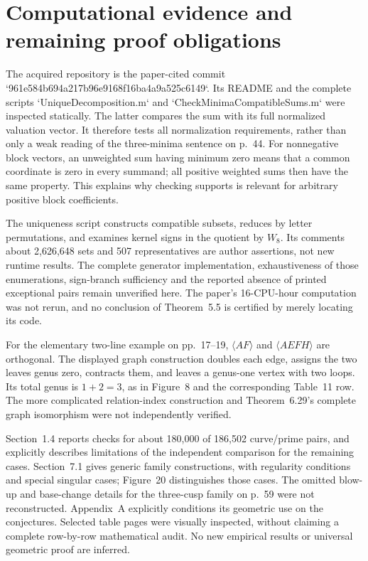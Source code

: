\documentclass[10pt]{article}
\begin{document}
\section*{Computational evidence and remaining proof obligations}
The acquired repository is the paper-cited commit `961e584b694a217b96e9168f16ba4a9a525c6149`. Its README and the complete scripts `UniqueDecomposition.m` and `CheckMinimaCompatibleSums.m` were inspected statically. The latter compares the sum with its full normalized valuation vector. It therefore tests all normalization requirements, rather than only a weak reading of the three-minima sentence on p. 44. For nonnegative block vectors, an unweighted sum having minimum zero means that a common coordinate is zero in every summand; all positive weighted sums then have the same property. This explains why checking supports is relevant for arbitrary positive block coefficients.\par
The uniqueness script constructs compatible subsets, reduces by letter permutations, and examines kernel signs in the quotient by \(W_8\). Its comments about 2,626,648 sets and 507 representatives are author assertions, not new runtime results. The complete generator implementation, exhaustiveness of those enumerations, sign-branch sufficiency and the reported absence of printed exceptional pairs remain unverified here. The paper’s 16-CPU-hour computation was not rerun, and no conclusion of Theorem 5.5 is certified by merely locating its code.\par
For the elementary two-line example on pp. 17–19, \(\langle AF\rangle\) and \(\langle AEFH\rangle\) are orthogonal. The displayed graph construction doubles each edge, assigns the two leaves genus zero, contracts them, and leaves a genus-one vertex with two loops. Its total genus is \(1+2=3\), as in Figure 8 and the corresponding Table 11 row. The more complicated relation-index construction and Theorem 6.29’s complete graph isomorphism were not independently verified.\par
Section 1.4 reports checks for about 180,000 of 186,502 curve/prime pairs, and explicitly describes limitations of the independent comparison for the remaining cases. Section 7.1 gives generic family constructions, with regularity conditions and special singular cases; Figure 20 distinguishes those cases. The omitted blow-up and base-change details for the three-cusp family on p. 59 were not reconstructed. Appendix A explicitly conditions its geometric use on the conjectures. Selected table pages were visually inspected, without claiming a complete row-by-row mathematical audit. No new empirical results or universal geometric proof are inferred.\par
\end{document}
